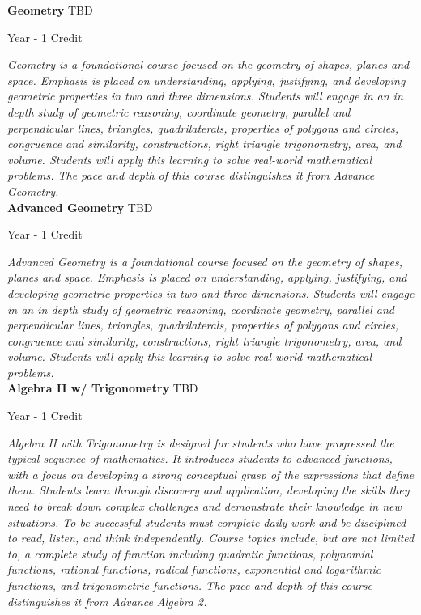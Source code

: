 \noindent\textbf{Geometry} \hfill TBD

\noindent Year - 1 Credit

\vspace{1mm}\emph{Geometry is a foundational course focused on the geometry of shapes, planes and space. Emphasis is placed on understanding, applying, justifying, and developing geometric properties in two and three dimensions. Students will engage in an in depth study of geometric reasoning, coordinate geometry, parallel and perpendicular lines, triangles, quadrilaterals, properties of polygons and circles, congruence and similarity, constructions, right triangle trigonometry, area, and volume. Students will apply this learning to solve real-world mathematical problems. The pace and depth of this course distinguishes it from Advance Geometry.}\\


\noindent\textbf{Advanced Geometry} \hfill TBD

\noindent Year - 1 Credit

\vspace{1mm}\emph{Advanced Geometry is a foundational course focused on the geometry of shapes, planes and space. Emphasis is placed on understanding, applying, justifying, and developing geometric properties in two and three dimensions. Students will engage in an in depth study of geometric reasoning, coordinate geometry, parallel and perpendicular lines, triangles, quadrilaterals, properties of polygons and circles, congruence and similarity, constructions, right triangle trigonometry, area, and volume. Students will apply this learning to solve real-world mathematical problems.}\\


\noindent\textbf{Algebra II w/ Trigonometry} \hfill TBD

\noindent Year - 1 Credit

\vspace{1mm}\emph{Algebra II with Trigonometry is designed for students who have progressed the typical sequence of mathematics. It introduces students to advanced functions, with a focus on developing a strong conceptual grasp of the expressions that define them. Students learn through discovery and application, developing the skills they need to break down complex challenges and demonstrate their knowledge in new situations. To be successful students must complete daily work and be disciplined to read, listen, and think independently. Course topics include, but are not limited to, a complete study of function including quadratic functions, polynomial functions, rational functions, radical functions, exponential and logarithmic functions, and trigonometric functions. The pace and depth of this course distinguishes it from Advance Algebra 2.}\\



